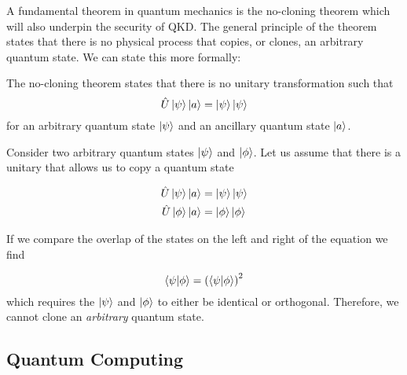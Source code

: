 A fundamental theorem in quantum mechanics is the {\color{bristol-red} no-cloning theorem} which will also underpin the security of \ac{QKD}. The general principle of the theorem states that there is no physical process that copies, or clones, an arbitrary quantum state. We can state this more formally:


\begin{theorem}
	 The no-cloning theorem states that there is no unitary transformation such that
	 \begin{equation}
	 	\hat{U}\ket{\psi}\ket{a} = \ket{\psi}\ket{\psi}
	 \end{equation}
	 for an arbitrary quantum state $\ket{\psi}$ and an ancillary quantum state $\ket{a}$.
\end{theorem}

Consider two arbitrary quantum states $\ket{\psi}$ and $\ket{\phi}$. Let us assume that there is a unitary that allows us to copy a quantum state

\begin{align}
	\hat{U}\ket{\psi}\ket{a} &= \ket{\psi}\ket{\psi}\\
	\hat{U}\ket{\phi}\ket{a} &= \ket{\phi}\ket{\phi}
\end{align}

If we compare the overlap of the states on the left and right of the equation we find

\begin{equation}
	\braket{\psi|\phi} = \left(\braket{\psi|\phi}\right)^2
\end{equation}
which requires the $\ket{\psi}$ and $\ket{\phi}$ to either be identical or orthogonal. Therefore, we cannot clone an \emph{arbitrary} quantum state.

\subsection{Quantum Computing}

